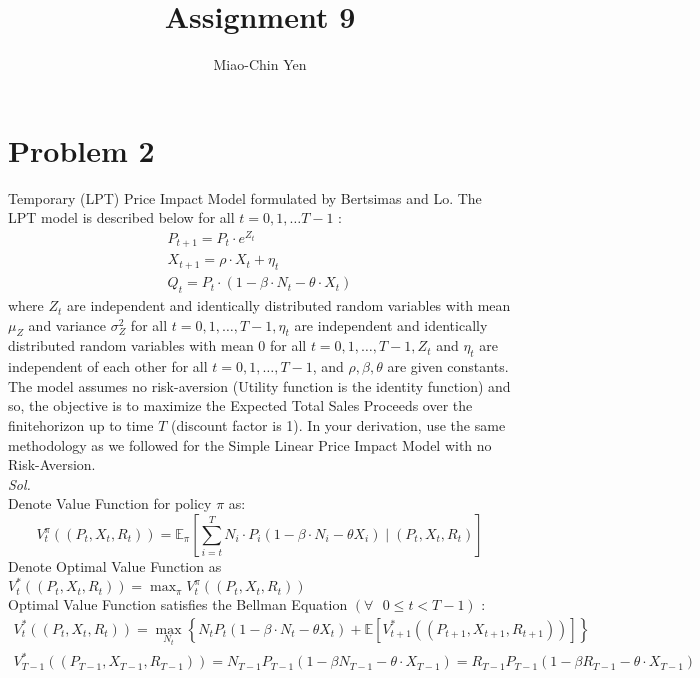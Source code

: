 \documentclass{article}
\title{Assignment 9}
\author{Miao-Chin Yen}
\begin{document}
\maketitle


\section*{Problem 2}
Temporary (LPT) Price Impact Model formulated by Bertsimas and Lo. The LPT model is described below for all $t=0,1, \ldots T-1$ :
$$
\begin{gathered}
P_{t+1}=P_{t} \cdot e^{Z_{t}} \\
X_{t+1}=\rho \cdot X_{t}+\eta_{t} \\
Q_{t}=P_{t} \cdot\left(1-\beta \cdot N_{t}-\theta \cdot X_{t}\right)
\end{gathered}
$$
where $Z_{t}$ are independent and identically distributed random variables with mean $\mu_{Z}$ and variance $\sigma_{Z}^{2}$ for all $t=0,1, \ldots, T-1, \eta_{t}$ are independent and identically distributed random variables with mean 0 for all $t=0,1, \ldots, T-1, Z_{t}$ and $\eta_{t}$ are independent of each other for all $t=0,1, \ldots, T-1$, and $\rho, \beta, \theta$ are given constants. The model assumes no risk-aversion (Utility function is the identity function) and so, the objective is to maximize the Expected Total Sales Proceeds over the finitehorizon up to time $T$ (discount factor is 1). In your derivation, use the same methodology as we followed for the Simple Linear Price Impact Model with no Risk-Aversion.\\
\textit{Sol.}\\
Denote Value Function for policy $\pi$ as:
$$
V_{t}^{\pi}\left(\left(P_{t}, X_{t}, R_{t}\right)\right)=\mathbb{E}_{\pi}\left[\sum_{i=t}^{T} N_{i} \cdot P_{i}\left(1-\beta \cdot N_{i} - \theta X_{i}\right) \mid\left(P_{t}, X_{t}, R_{t}\right)\right]
$$
Denote Optimal Value Function as $V_{t}^{*}\left(\left(P_{t}, X_{t}, R_{t}\right)\right)=\max _{\pi} V_{t}^{\pi}\left(\left(P_{t}, X_{t}, R_{t}\right)\right)$\\
Optimal Value Function satisfies the Bellman Equation $(\forall \text{ } 0 \leq t<T-1)$ :
$$
\begin{gathered}
V_{t}^{*}\left(\left(P_{t},X_{t}, R_{t}\right)\right)=\max _{N_{t}}\left\{N_{t}P_{t}\left(1-\beta \cdot N_{t}- \theta X_{t}\right)+\mathbb{E}\left[V_{t+1}^{*}\left(\left(P_{t+1},X_{t+1}, R_{t+1}\right)\right)\right]\right\} \\
V_{T-1}^{*}\left(\left(P_{T-1},X_{T-1}, R_{T-1}\right)\right)=N_{T-1}P_{T-1}\left(1-\beta N_{T-1} - 
\theta \cdot X_{T-1}\right)=R_{T-1}P_{T-1}\left(1-\beta R_{T-1} - 
\theta \cdot X_{T-1}\right)
\end{gathered}
$$
\end{document}
